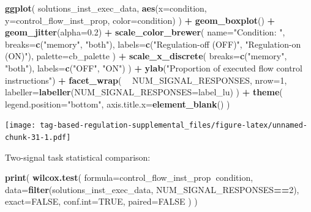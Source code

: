 \documentclass[]{book}
\newenvironment{Shaded}{\begin{snugshade}}{\end{snugshade}}
\newcommand{\DataTypeTok}[1]{\textcolor[rgb]{0.13,0.29,0.53}{#1}}
\newcommand{\DecValTok}[1]{\textcolor[rgb]{0.00,0.00,0.81}{#1}}
\newcommand{\FloatTok}[1]{\textcolor[rgb]{0.00,0.00,0.81}{#1}}
\newcommand{\KeywordTok}[1]{\textcolor[rgb]{0.13,0.29,0.53}{\textbf{#1}}}
\newcommand{\NormalTok}[1]{#1}
\newcommand{\OperatorTok}[1]{\textcolor[rgb]{0.81,0.36,0.00}{\textbf{#1}}}
\newcommand{\OtherTok}[1]{\textcolor[rgb]{0.56,0.35,0.01}{#1}}
\newcommand{\StringTok}[1]{\textcolor[rgb]{0.31,0.60,0.02}{#1}}
\begin{document}
\begin{Shaded}
\begin{Highlighting}[]
\KeywordTok{ggplot}\NormalTok{( solutions_inst_exec_data, }\KeywordTok{aes}\NormalTok{(}\DataTypeTok{x=}\NormalTok{condition, }\DataTypeTok{y=}\NormalTok{control_flow_inst_prop, }\DataTypeTok{color=}\NormalTok{condition) ) }\OperatorTok{+}
\StringTok{  }\KeywordTok{geom_boxplot}\NormalTok{() }\OperatorTok{+}
\StringTok{  }\KeywordTok{geom_jitter}\NormalTok{(}\DataTypeTok{alpha=}\FloatTok{0.2}\NormalTok{) }\OperatorTok{+}
\StringTok{  }\KeywordTok{scale_color_brewer}\NormalTok{(}
    \DataTypeTok{name=}\StringTok{"Condition: "}\NormalTok{,}
    \DataTypeTok{breaks=}\KeywordTok{c}\NormalTok{(}\StringTok{"memory"}\NormalTok{, }\StringTok{"both"}\NormalTok{),}
    \DataTypeTok{labels=}\KeywordTok{c}\NormalTok{(}\StringTok{"Regulation-off (OFF)"}\NormalTok{, }\StringTok{"Regulation-on (ON)"}\NormalTok{),}
    \DataTypeTok{palette=}\NormalTok{cb_palette}
\NormalTok{  ) }\OperatorTok{+}
\StringTok{  }\KeywordTok{scale_x_discrete}\NormalTok{(}
    \DataTypeTok{breaks=}\KeywordTok{c}\NormalTok{(}\StringTok{"memory"}\NormalTok{, }\StringTok{"both"}\NormalTok{),}
    \DataTypeTok{labels=}\KeywordTok{c}\NormalTok{(}\StringTok{"OFF"}\NormalTok{, }\StringTok{"ON"}\NormalTok{)}
\NormalTok{  ) }\OperatorTok{+}
\StringTok{  }\KeywordTok{ylab}\NormalTok{(}\StringTok{"Proportion of executed flow control instructions"}\NormalTok{) }\OperatorTok{+}
\StringTok{  }\KeywordTok{facet_wrap}\NormalTok{(}
    \OperatorTok{~}\StringTok{ }\NormalTok{NUM_SIGNAL_RESPONSES,}
    \DataTypeTok{nrow=}\DecValTok{1}\NormalTok{,}
    \DataTypeTok{labeller=}\KeywordTok{labeller}\NormalTok{(}\DataTypeTok{NUM_SIGNAL_RESPONSES=}\NormalTok{label_lu)}
\NormalTok{  ) }\OperatorTok{+}
\StringTok{  }\KeywordTok{theme}\NormalTok{(}
    \DataTypeTok{legend.position=}\StringTok{"bottom"}\NormalTok{,}
    \DataTypeTok{axis.title.x=}\KeywordTok{element_blank}\NormalTok{()}
\NormalTok{  )}
\end{Highlighting}
\end{Shaded}

\texttt{[image: tag-based-regulation-supplemental\_files/figure-latex/unnamed-chunk-31-1.pdf]}

Two-signal task statistical comparison:

\begin{Shaded}
\begin{Highlighting}[]
\KeywordTok{print}\NormalTok{(}
  \KeywordTok{wilcox.test}\NormalTok{(}
    \DataTypeTok{formula=}\NormalTok{control_flow_inst_prop}\OperatorTok{~}\NormalTok{condition,}
    \DataTypeTok{data=}\KeywordTok{filter}\NormalTok{(solutions_inst_exec_data, NUM_SIGNAL_RESPONSES}\OperatorTok{==}\DecValTok{2}\NormalTok{),}
    \DataTypeTok{exact=}\OtherTok{FALSE}\NormalTok{,}
    \DataTypeTok{conf.int=}\OtherTok{TRUE}\NormalTok{,}
    \DataTypeTok{paired=}\OtherTok{FALSE}
\NormalTok{  )}
\NormalTok{)}
\end{Highlighting}
\end{Shaded}
\end{document}
